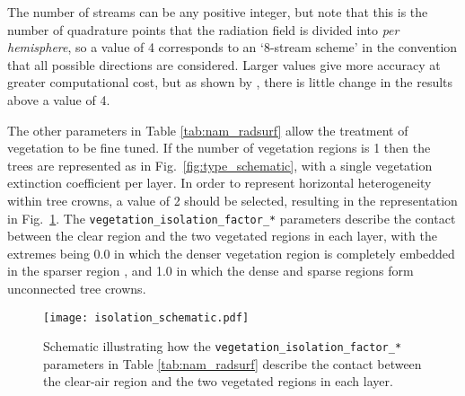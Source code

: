 \documentclass[a4,oneside]{article}
\def\codesize{\small}
\def\code#1{{\codesize\texttt{#1}}}
\begin{document}
The number of streams can be any positive integer, but note that this
is the number of quadrature points that the radiation field is divided
into \emph{per hemisphere}, so a value of 4 corresponds to an
`8-stream scheme' in the convention that all possible directions are
considered.  Larger values give more accuracy at greater computational
cost, but as shown by \cite{Hogan2019b}, there is little change in the
results above a value of 4.

The other parameters in Table \ref{tab:nam_radsurf} allow the
treatment of vegetation to be fine tuned. If the number of vegetation
regions is 1 then the trees are represented as in
Fig.\ \ref{fig:type_schematic}, with a single vegetation extinction
coefficient per layer.  In order to represent horizontal heterogeneity
within tree crowns, a value of 2 should be selected, resulting in the
representation in Fig.\ \ref{fig:isolation_schematic}. The
\code{vegetation\_isolation\_factor\_*} parameters describe the
contact between the clear region and the two vegetated regions in each
layer, with the extremes being 0.0 in which the denser vegetation
region is completely embedded in the sparser region \cite[the
  assumption used by][]{Hogan+2018}, and 1.0 in which the dense and
sparse regions form unconnected tree crowns.

\begin{figure}[b!]
  \centerline{\texttt{[image: isolation\_schematic.pdf]}}
  \caption{\label{fig:isolation_schematic}Schematic illustrating how
    the \code{vegetation\_isolation\_factor\_*} parameters in Table
    \ref{tab:nam_radsurf} describe the contact between the clear-air
    region and the two vegetated regions in each layer.}
\end{figure}
\end{document}
